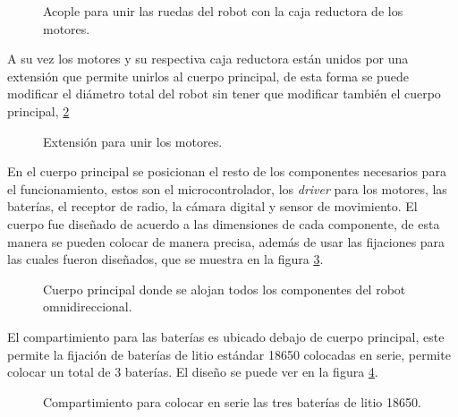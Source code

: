 \documentclass{iccmemoria}
\begin{document}
\begin{figure}[H]
  \centering
  
  \caption[Acople entre la rueda y la caja reductora.]{Acople para unir las ruedas del robot con la caja reductora de los motores.}
  \label{fig:cupling}
\end{figure}

A su vez los motores y su respectiva caja reductora están unidos por una extensión que permite unirlos al cuerpo principal, de esta forma se puede modificar el diámetro total del robot sin tener que modificar también el cuerpo principal, \ref{fig:arm}\\

\begin{figure}[H]
  \centering
  
  \caption[Extensión para unir los motores.]{Extensión para unir los motores.}
  \label{fig:arm}
\end{figure}

En el cuerpo principal se posicionan el resto de los componentes necesarios para el funcionamiento, estos son el microcontrolador, los \emph{driver} para los motores, las baterías, el receptor de radio, la cámara digital y sensor de movimiento. El cuerpo fue diseñado de acuerdo a las dimensiones de cada componente, de esta manera se pueden colocar de manera precisa, además de usar las fijaciones para las cuales fueron diseñados, que se muestra en la figura \ref{fig:frame}.\\

\begin{figure}[H]
  \centering
  
  \caption[Cuerpo principal robot omnidireccional.]{Cuerpo principal donde se alojan todos los componentes del robot omnidireccional.}
  \label{fig:frame}
\end{figure}

El compartimiento para las baterías es ubicado debajo de cuerpo principal, este permite la fijación de baterías de litio estándar 18650 colocadas en serie, permite colocar un total de 3 baterías. El diseño se puede ver en la figura \ref{fig:battery_compartment}.

\begin{figure}[H]
  \centering
  
  \caption[Compartimiento de baterías.]{Compartimiento para colocar en serie las tres baterías de litio 18650.}
  \label{fig:battery_compartment}
\end{figure}
\end{document}
